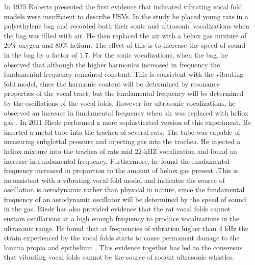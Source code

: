 \documentclass[12pt, letter]{report}
\begin{document}
In 1975 Roberts presented the first evidence that indicated vibrating vocal fold models were insufficient to describe USVs. In the study he placed young rats in a polyethylene bag and recorded both their sonic and ultrasonic vocalizations when the bag was filled with air. He then replaced the air with a heliox gas mixture of $20\%$ oxygen and $80\%$ helium. The effect of this is to increase the speed of sound in the bag by a factor of $1.7$. For the sonic vocalizations, when the bag, he observed that although the higher harmonics increased in frequency the fundamental frequency remained constant. This is consistent with the vibrating fold model, since the harmonic content will be determined by resonance properties of the vocal tract, but the fundamental frequency will be determined by the oscillations of the vocal folds. However for ultrasonic vocalizations, he observed an increase in fundamental frequency when air was replaced with heliox gas \cite{Roberts1975}. In 2011 Riede performed a more sophisticated version of this experiment. He inserted a metal tube into the trachea of several rats. The tube was capable of measuring subglottal pressure and injecting gas into the trachea. He injected a heliox mixture into the trachea of rats mid 22-kHZ vocalization and found an increase in fundamental frequency. Furthermore, he found the fundamental frequency increased in proportion to the amount of heliox gas present \cite{Riede2011}.This is inconsistent with a vibrating vocal fold model and indicates the source of oscillation is aerodynamic rather than physical in nature, since the fundamental frequency of an aerodynamic oscillator will be determined by the speed of sound in the gas. Riede has also provided evidence that the rat vocal folds cannot sustain oscillations at a high enough frequency to produce vocalizations in the ultrasonic range. He found that at frequencies of vibration higher than 4 kHz the strain experienced by the vocal folds starts to cause permanent damage to the lamina propia and epithelium \cite{Riede2011c}. This evidence together has led to the consensus that vibrating vocal folds cannot be the source of rodent ultrasonic whistles.
\end{document}
